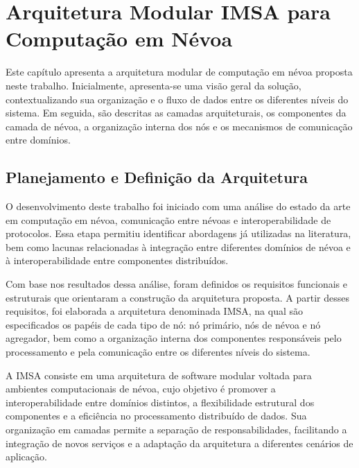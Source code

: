 \chapter{Arquitetura Modular IMSA para Computação em Névoa}\label{cap:proposta}

Este capítulo apresenta a arquitetura modular de computação em névoa proposta neste trabalho. Inicialmente, apresenta-se uma visão geral da solução, contextualizando sua organização e o fluxo de dados entre os diferentes níveis do sistema. Em seguida, são descritas as camadas arquiteturais, os componentes da camada de névoa, a organização interna dos nós e os mecanismos de comunicação entre domínios.

\section{Planejamento e Definição da Arquitetura}

O desenvolvimento deste trabalho foi iniciado com uma análise do estado da arte em computação em névoa, comunicação entre névoas e interoperabilidade de protocolos. Essa etapa permitiu identificar abordagens já utilizadas na literatura, bem como lacunas relacionadas à integração entre diferentes domínios de névoa e à interoperabilidade entre componentes distribuídos.

Com base nos resultados dessa análise, foram definidos os requisitos funcionais e estruturais que orientaram a construção da arquitetura proposta. A partir desses requisitos, foi elaborada a arquitetura denominada \gls{IMSA}, na qual são especificados os papéis de cada tipo de nó: nó primário, nós de névoa e nó agregador, bem como a organização interna dos componentes responsáveis pelo processamento e pela comunicação entre os diferentes níveis do sistema.

A \gls{IMSA} consiste em uma arquitetura de software modular voltada para ambientes computacionais de névoa, cujo objetivo é promover a interoperabilidade entre domínios distintos, a flexibilidade estrutural dos componentes e a eficiência no processamento distribuído de dados. Sua organização em camadas permite a separação de responsabilidades, facilitando a integração de novos serviços e a adaptação da arquitetura a diferentes cenários de aplicação.

